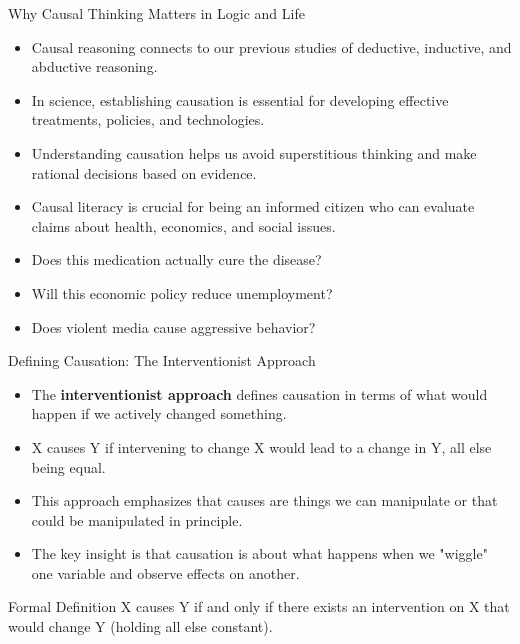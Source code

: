\documentclass{beamer}
\begin{document}
	\begin{frame}{Why Causal Thinking Matters in Logic and Life}
		\begin{itemize}
			\item Causal reasoning connects to our previous studies of deductive, inductive, and abductive reasoning.
			\item In science, establishing causation is essential for developing effective treatments, policies, and technologies.
			\item Understanding causation helps us avoid superstitious thinking and make rational decisions based on evidence.
			\item Causal literacy is crucial for being an informed citizen who can evaluate claims about health, economics, and social issues.
		\end{itemize}
		
		\begin{example}
			\begin{itemize}
				\item Does this medication actually cure the disease?
				\item Will this economic policy reduce unemployment?
				\item Does violent media cause aggressive behavior?
			\end{itemize}
		\end{example}
	\end{frame}
	
	\begin{frame}{Defining Causation: The Interventionist Approach}
		\begin{itemize}
			\item The \textbf{interventionist approach} defines causation in terms of what would happen if we actively changed something.
			\item X causes Y if intervening to change X would lead to a change in Y, all else being equal.
			\item This approach emphasizes that causes are things we can manipulate or that could be manipulated in principle.
			\item The key insight is that causation is about what happens when we "wiggle" one variable and observe effects on another.
		\end{itemize}
		
		\begin{block}{Formal Definition}
			X causes Y if and only if there exists an intervention on X that would change Y (holding all else constant).
		\end{block}
	\end{frame}
	
\end{document}
